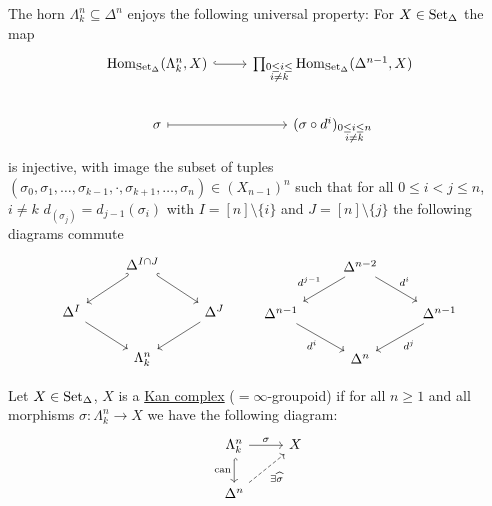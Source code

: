 \begin{rmk}
    The horn $\Lambda_k^n \subseteq \Delta^n$ enjoys the following universal property:
    For $X \in \operatorname{Set}_{\Delta}$ the map 
    \[
    \begin{tikzcd}
        \Hom_{\SetD}(\Lambda_k^n,X)
        \arrow[r, hook]
        &
        \prod_{\substack{0\leq i \leq \\ i \neq k}}
        \Hom_{\SetD}(\Delta^{n-1},X)
        \\
        \sigma 
        \arrow[r, mapsto]
        &
        (\sigma \circ d^i)_{\substack{0 \leq i \leq n \\ i \neq k}}
    \end{tikzcd}
    \]
    is injective, with image the subset of tuples $(\sigma_0,\sigma_1,\dotsc,\sigma_{k-1},\cdot, \sigma_{k+1}, \dotsc, \sigma_n) \in (X_{n-1})^n$ such that for all $ 0 \leq i < j \leq n$, $i \neq k$ $d_(\sigma_j)=d_{j-1}(\sigma_i)$ with $I = [n] \setminus \{i\}$ and $J=[n]\setminus \{j\}$ the following diagrams commute
    \[
    \begin{tikzcd}
    	& {\Delta^{I \cap J}} \\
    	{\Delta^I} && {\Delta^J} \\
    	& {\Lambda_k^n}
    	\arrow[hook', from=1-2, to=2-1]
    	\arrow[hook, from=1-2, to=2-3]
    	\arrow[from=2-1, to=3-2]
    	\arrow[from=2-3, to=3-2]
    \end{tikzcd}
    \qquad
    \begin{tikzcd}
        & \Delta^{n-2} \\
        \Delta^{n-1} && \Delta^{n-1} \\
        & \Delta^n
        \arrow[from=1-2, to=2-1, "d^{j-1}"']
        \arrow[from=1-2, to=2-3, "d^{i}"]
        \arrow[from=2-1, to=3-2, "d^{i}"']
        \arrow[from=2-3, to=3-2, "d^{j}"]
    \end{tikzcd}
    \]
\end{rmk}

\begin{defi}
    Let $X \in \operatorname{Set}_{\Delta} $, $X$ is a \underline{Kan complex} ($=\infty$-groupoid) if for all $n\geq 1$ and all morphisms $\sigma\colon \Lambda_k^n \to X$ we have the following diagram:
    \[
    \begin{tikzcd}
        \Lambda_k^n
        \arrow[r, "\sigma"]
        \arrow[d, hook, "\can"']
        &
        X
        \\
        \Delta^n
        \arrow[ur, dashed, "\exists \widehat{\sigma}"']
    \end{tikzcd}
    \]
\end{defi}


